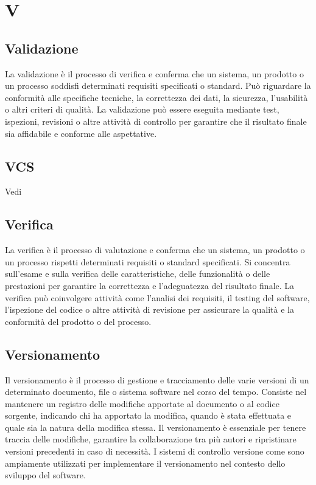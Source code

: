 \section{V}

\vspace{2em}
\subsection*{Validazione}
La validazione è il processo di verifica e conferma che un sistema, un prodotto o un processo soddisfi determinati requisiti specificati o standard. Può riguardare la conformità alle specifiche tecniche, la correttezza dei dati, la sicurezza, l'usabilità o altri criteri di qualità. La validazione può essere eseguita mediante test, ispezioni, revisioni o altre attività di controllo per garantire che il risultato finale sia affidabile e conforme alle aspettative.

\vspace{2em}
\subsection*{VCS}
\par Vedi 


\vspace{2em}
\subsection*{Verifica}
La verifica è il processo di valutazione e conferma che un sistema, un prodotto o un processo rispetti determinati requisiti o standard specificati. Si concentra sull'esame e sulla verifica delle caratteristiche, delle funzionalità o delle prestazioni per garantire la correttezza e l'adeguatezza del risultato finale. La verifica può coinvolgere attività come l'analisi dei requisiti, il testing del software, l'ispezione del codice o altre attività di revisione per assicurare la qualità e la conformità del prodotto o del processo.

\vspace{2em}
\subsection*{Versionamento}
Il versionamento è il processo di gestione e tracciamento delle varie versioni di un determinato documento, file o sistema software nel corso del tempo. Consiste nel mantenere un registro delle modifiche apportate al documento o al codice sorgente, indicando chi ha apportato la modifica, quando è stata effettuata e quale sia la natura della modifica stessa. Il versionamento è essenziale per tenere traccia delle modifiche, garantire la collaborazione tra più autori e ripristinare versioni precedenti in caso di necessità. I sistemi di controllo versione come  sono ampiamente utilizzati per implementare il versionamento nel contesto dello sviluppo del software.

